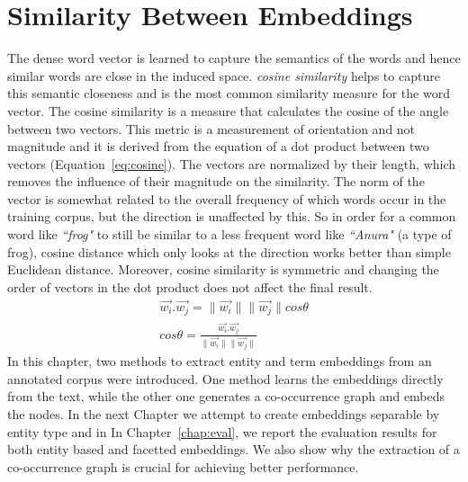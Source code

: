 \section{Similarity Between Embeddings }\label{sec:similarity}
The dense word vector is learned to capture the semantics of the words and hence similar words are close in the induced space. \emph{cosine similarity} helps to capture this semantic closeness and is the most common similarity measure for the word vector. The cosine similarity is a measure that calculates the cosine of the angle between two vectors. This metric is a measurement of orientation and not magnitude and it is derived from the equation of a dot product between two vectors (Equation~\ref{eq:cosine}). The vectors are normalized by their length, which removes the influence of their magnitude on the similarity. The norm of the vector is somewhat related to the overall frequency of which words occur in the training corpus, but the direction is unaffected by this. So in order for a common word like \emph{``frog"} to still be similar to a less frequent word like \emph{``Anura"} (a type of frog), cosine distance which only looks at the direction works better than simple Euclidean distance. Moreover, cosine similarity is symmetric and changing the order of vectors in the dot product does not affect the final result.
\begin{equation}
\begin{split}
\overrightarrow { w_i } .\overrightarrow { w_j } =\parallel \overrightarrow { w_i } \parallel \parallel \overrightarrow { w_j } \parallel cos\theta 
\\
cos\theta =\frac { \overrightarrow { w_i } .\overrightarrow { w_j }  }{ \parallel \overrightarrow { w_i } \parallel \parallel \overrightarrow { w_j } \parallel  } 
\end{split}
\label{eq:cosine}
\end{equation}
\ornament
In this chapter,  two methods to extract entity and term embeddings from an annotated corpus were introduced. One method learns the embeddings directly from the text, while the other one generates a co-occurrence graph and embeds the nodes. In the next Chapter we attempt to create embeddings separable by entity type and in In Chapter~\ref{chap:eval}, we report the evaluation results for both entity based and facetted embeddings. We also show why the extraction of a co-occurrence graph is crucial for achieving better performance. 

